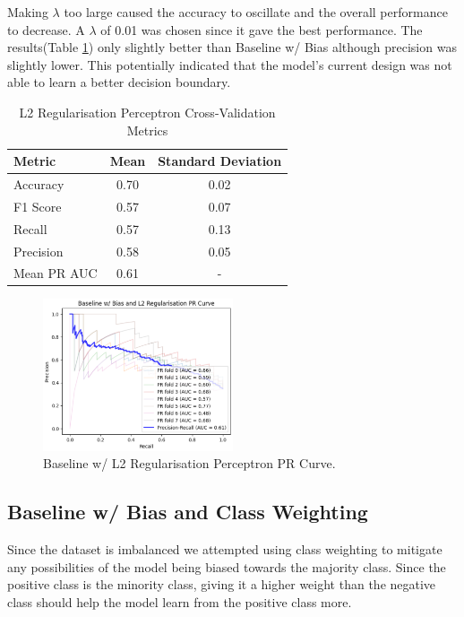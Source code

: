 Making $\lambda$ too large caused the accuracy to oscillate and the overall performance to decrease. A $\lambda$ of 0.01 was chosen since it gave the best performance. The results(Table \ref{tab:reg_metrics}) only slightly better than Baseline w/ Bias although precision was slightly lower. This potentially indicated that the model's current design was not able to learn a better decision boundary.

\begin{table}[ht!]
    \centering
    \begin{tabular}{lcc}
        \toprule
        \textbf{Metric} & \textbf{Mean} & \textbf{Standard Deviation} \\
        \midrule
        Accuracy & 0.70 & 0.02 \\
        F1 Score & 0.57 & 0.07 \\
        Recall & 0.57 & 0.13 \\
        Precision & 0.58 & 0.05 \\
        Mean PR AUC & 0.61 & - \\
        \bottomrule
    \end{tabular}
    \caption{L2 Regularisation Perceptron Cross-Validation Metrics}
    \label{tab:reg_metrics}
\end{table}

\begin{figure}[ht!]
    \centering
    \includegraphics[width=0.5\textwidth]{images/reg_pr.png}
    \caption{Baseline w/ L2 Regularisation Perceptron PR Curve.}
    \label{fig:reg_pr}
\end{figure}


\subsection{Baseline w/ Bias and Class Weighting}

Since the dataset is imbalanced we attempted using class weighting to mitigate any possibilities of the model being biased towards the majority class. Since the positive class is the minority class, giving it a higher weight than the negative class should help the model learn from the positive class more. 

